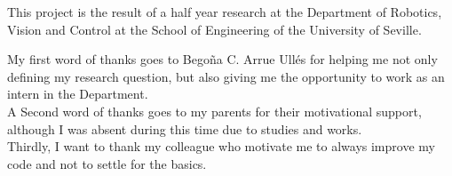 
This project is the result of a half year research at the Department of Robotics, Vision and Control at the School of Engineering of the University of Seville.


My first word of thanks goes to Bego\~na C. Arrue Ull\'es for helping me not only defining my research question, but also giving me the opportunity to work as an intern in the Department. \\

A Second word of thanks goes to my parents for their motivational support, although I was absent during this time due to studies and works.  \\

Thirdly, I want to thank my colleague who motivate me to always improve my code and not to settle for the basics.  \\

